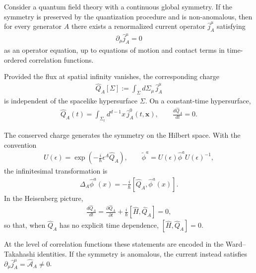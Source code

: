 \documentclass[../QFT_main.tex]{subfiles}
\begin{document}
\begin{mytheorem}
Consider a quantum field theory with a continuous global symmetry.
If the symmetry is preserved by the quantization procedure and is
non-anomalous, then for every generator $A$ there exists a renormalized
current operator $\hat{j}_A^\mu$ satisfying
{\small\begin{align}
    \partial_\mu\hat{j}_A^\mu=0
\end{align}}
as an operator equation, up to equations of motion and contact terms
in time-ordered correlation functions.

Provided the flux at spatial infinity vanishes, the corresponding
charge
{\small\begin{align}
    \hat{Q}_A[\Sigma]
    :=\int_\Sigma d\Sigma_\mu\,\hat{j}_A^\mu
\end{align}}
is independent of the spacelike hypersurface $\Sigma$. On a
constant-time hypersurface,
{\small\begin{align}
    \hat{Q}_A(t)
    =\int_{\Sigma_t}d^{d-1}\!x\,\hat{j}_A^0(t,\mathbf{x}),
    \qquad
    \frac{d\hat{Q}_A}{dt}=0.
\end{align}}

The conserved charge generates the symmetry on the Hilbert space.
With the convention
{\small\begin{align}
    U(\epsilon)
    =\exp\!\left(-\frac{i}{\hbar}\epsilon^A\hat{Q}_A\right),
    \qquad
    \tilde{\phi}^a
    =U(\epsilon)\hat{\phi}^aU(\epsilon)^{-1},
\end{align}}
the infinitesimal transformation is
{\small\begin{align}
    \Delta_A\hat{\phi}^a(x)
    =-\frac{i}{\hbar}
      [\hat{Q}_A,\hat{\phi}^a(x)].
\end{align}}
In the Heisenberg picture,
{\small\begin{align}
    \frac{d\hat{Q}_A}{dt}
    =
    \frac{\partial\hat{Q}_A}{\partial t}
    +\frac{i}{\hbar}[\hat{H},\hat{Q}_A]
    =0,
\end{align}}
so that, when $\hat{Q}_A$ has no explicit time dependence,
$[\hat{H},\hat{Q}_A]=0$.

At the level of correlation functions these statements are encoded
in the Ward--Takahashi identities. If the symmetry is anomalous, the
current instead satisfies
$\partial_\mu\hat{j}_A^\mu=\hat{\mathcal A}_A\neq0$.
\end{mytheorem}
\end{document}
